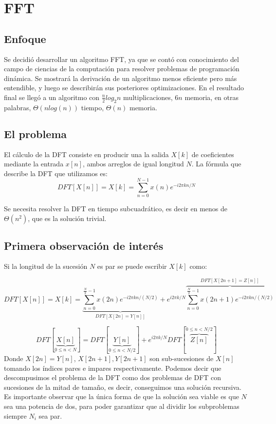 \documentclass[assd_tp2_main.tex]{subfiles}
\begin{document}
\section{FFT}

\subsection{Enfoque}
Se decidió desarrollar un algoritmo FFT, ya que se contó con conocimiento del campo de ciencias de la computación para resolver problemas de programación dinámica. Se mostrará la derivación de un algoritmo menos eficiente pero más entendible, y luego se describirán sus posteriores optimizaciones.
En el resultado final se llegó a un algoritmo con $\frac{n}{2}log_2{n}$ multiplicaciones, $6n$ memoria, en otras palabras, 
$\Theta(nlog(n))$ tiempo, $\Theta(n)$ memoria. 

\subsection{El problema}
El cálculo de la DFT consiste en producir una la salida $X[k]$ de coeficientes mediante la entrada $x[n]$, ambos arreglos de igual longitud $N$. La fórmula que describe la DFT que utilizamos es:
\begin{equation}
	DFT[X[n]] = X[k]=\sum_{n=0}^{N-1}x(n)e^{-i2\pi kn/N}
\end{equation}

Se necesita resolver la DFT en tiempo subcuadrático, es decir en menos de $\Theta(n^2)$, que es la solución trivial.

\subsection{Primera observación de interés}
Si la longitud de la sucesión $N$ es par se puede escribir $X[k]$ como:

\begin{equation}
	DFT[X[n]] = X[k]=
		\underbrace{
		\sum_{n=0}^{\frac{N}{2}-1}x(2n)e^{-i2\pi k n/(N/2)}
		}_{DFT[X[2n]=Y[n]]} +
		e^{i2\pi k /N}
		\overbrace{		
		\sum_{n=0}^{\frac{N}{2}-1}x(2n+1)e^{-i2\pi k n/(N/2)}
		}^{DFT[X[2n+1] = Z[n]]}
\end{equation}

\begin{equation}
	DFT[\underbrace{X[n]}_{0\leq n< N}]=DFT[\underbrace{Y[n]}_{0\leq n<N/2}]+e^{i2\pi k /N}DFT[\overbrace{Z[n]}^{0\leq n<N/2}]
\end{equation}
Donde $X[2n]=Y[n]$, $X[2n+1], Y[2n+1]$ son sub-sucesiones de $X[n]$ tomando los \'indices pares e impares respectivamente.
Podemos decir que descompusimos el problema de la DFT como dos problemas de DFT con sucesiones de la mitad de tamaño, es decir, conseguimos una solución recursiva. Es importante observar que la \'unica forma de que la soluci\'on sea viable es que $N$ sea una potencia de dos, para poder garantizar que al dividir los subproblemas siempre $N_i$ sea par.
\end{document}
